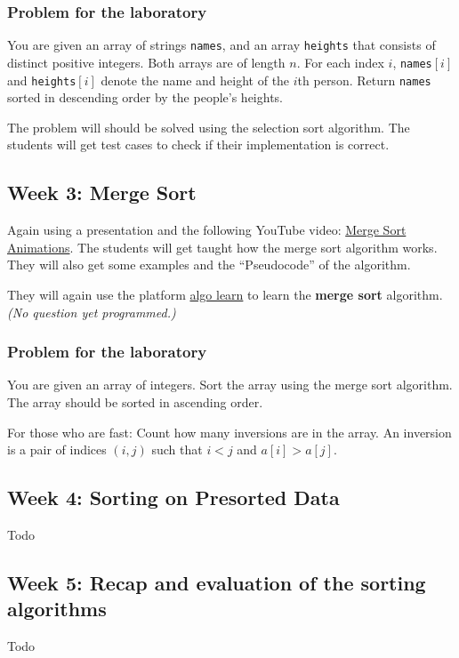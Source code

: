 \documentclass[10pt, oneside]{article}
\theoremstyle{remark}
\begin{document}
\subsubsection*{Problem for the laboratory}
\begin{tcolorbox}
  You are given an array of strings \texttt{names}, and an array \texttt{heights} that consists of distinct positive integers. Both arrays are of length $n$. For each index $i$, \texttt{names}$[i]$ and \texttt{heights}$[i]$ denote the name and height of the $i$th person. Return \texttt{names} sorted in descending order by the people's heights.
\end{tcolorbox}
The problem will should be solved using the selection sort algorithm. The students will get test cases to check if their implementation is correct.

\subsection{Week 3: Merge Sort}
Again using a presentation and the following YouTube video: \href{https://www.youtube.com/watch?v=ZRPoEKHXTJg}{Merge Sort Animations}. The students will get taught how the merge sort algorithm works. They will also get some examples and the \enquote{Pseudocode} of the algorithm.

They will again use the platform \href{https://tcs.uni-frankfurt.de/algo-learn-testing/refs_heads_feat-bubbleSort/en
}{algo learn} to learn the \textbf{merge sort} algorithm. \textit{(No question yet programmed.)}

\subsubsection*{Problem for the laboratory}
\begin{tcolorbox}
  You are given an array of integers. Sort the array using the merge sort algorithm. The array should be sorted in ascending order. 

  For those who are fast: Count how many inversions are in the array. An inversion is a pair of indices $(i, j)$ such that $i < j$ and $a[i] > a[j]$.
\end{tcolorbox}

\subsection{Week 4: Sorting on Presorted Data}
Todo

\subsection{Week 5: Recap and evaluation of the sorting algorithms}
Todo
\end{document}
